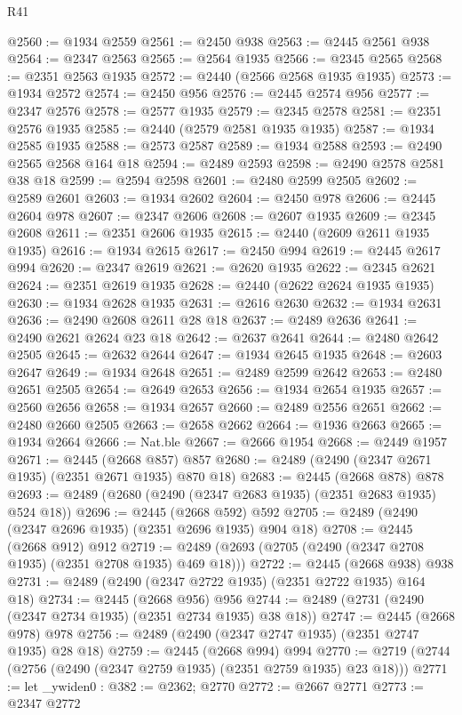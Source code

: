 \begin{lexlean}{R41}
\begin{coremodule}
@2560 := @1934 @2559
@2561 := @2450 @938
@2563 := @2445 @2561 @938
@2564 := @2347 @2563
@2565 := @2564 @1935
@2566 := @2345 @2565
@2568 := @2351 @2563 @1935
@2572 := @2440 (@2566 @2568 @1935 @1935)
@2573 := @1934 @2572
@2574 := @2450 @956
@2576 := @2445 @2574 @956
@2577 := @2347 @2576
@2578 := @2577 @1935
@2579 := @2345 @2578
@2581 := @2351 @2576 @1935
@2585 := @2440 (@2579 @2581 @1935 @1935)
@2587 := @1934 @2585 @1935
@2588 := @2573 @2587
@2589 := @1934 @2588
@2593 := @2490 @2565 @2568 @164 @18
@2594 := @2489 @2593
@2598 := @2490 @2578 @2581 @38 @18
@2599 := @2594 @2598
@2601 := @2480 @2599 @2505
@2602 := @2589 @2601
@2603 := @1934 @2602
@2604 := @2450 @978
@2606 := @2445 @2604 @978
@2607 := @2347 @2606
@2608 := @2607 @1935
@2609 := @2345 @2608
@2611 := @2351 @2606 @1935
@2615 := @2440 (@2609 @2611 @1935 @1935)
@2616 := @1934 @2615
@2617 := @2450 @994
@2619 := @2445 @2617 @994
@2620 := @2347 @2619
@2621 := @2620 @1935
@2622 := @2345 @2621
@2624 := @2351 @2619 @1935
@2628 := @2440 (@2622 @2624 @1935 @1935)
@2630 := @1934 @2628 @1935
@2631 := @2616 @2630
@2632 := @1934 @2631
@2636 := @2490 @2608 @2611 @28 @18
@2637 := @2489 @2636
@2641 := @2490 @2621 @2624 @23 @18
@2642 := @2637 @2641
@2644 := @2480 @2642 @2505
@2645 := @2632 @2644
@2647 := @1934 @2645 @1935
@2648 := @2603 @2647
@2649 := @1934 @2648
@2651 := @2489 @2599 @2642
@2653 := @2480 @2651 @2505
@2654 := @2649 @2653
@2656 := @1934 @2654 @1935
@2657 := @2560 @2656
@2658 := @1934 @2657
@2660 := @2489 @2556 @2651
@2662 := @2480 @2660 @2505
@2663 := @2658 @2662
@2664 := @1936 @2663
@2665 := @1934 @2664
@2666 := Nat.ble
@2667 := @2666 @1954
@2668 := @2449 @1957
@2671 := @2445 (@2668 @857) @857
@2680 := @2489 (@2490 (@2347 @2671 @1935) (@2351 @2671 @1935) @870 @18)
@2683 := @2445 (@2668 @878) @878
@2693 := @2489 (@2680 (@2490 (@2347 @2683 @1935) (@2351 @2683 @1935) @524 @18))
@2696 := @2445 (@2668 @592) @592
@2705 := @2489 (@2490 (@2347 @2696 @1935) (@2351 @2696 @1935) @904 @18)
@2708 := @2445 (@2668 @912) @912
@2719 := @2489 (@2693 (@2705 (@2490 (@2347 @2708 @1935) (@2351 @2708 @1935) @469 @18)))
@2722 := @2445 (@2668 @938) @938
@2731 := @2489 (@2490 (@2347 @2722 @1935) (@2351 @2722 @1935) @164 @18)
@2734 := @2445 (@2668 @956) @956
@2744 := @2489 (@2731 (@2490 (@2347 @2734 @1935) (@2351 @2734 @1935) @38 @18))
@2747 := @2445 (@2668 @978) @978
@2756 := @2489 (@2490 (@2347 @2747 @1935) (@2351 @2747 @1935) @28 @18)
@2759 := @2445 (@2668 @994) @994
@2770 := @2719 (@2744 (@2756 (@2490 (@2347 @2759 @1935) (@2351 @2759 @1935) @23 @18)))
@2771 := let _ywiden0 : @382 := @2362; @2770
@2772 := @2667 @2771
@2773 := @2347 @2772

\end{coremodule}
\end{lexlean}
